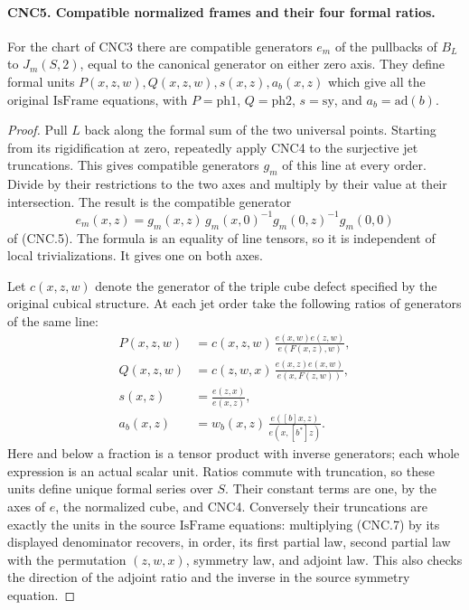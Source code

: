 \paragraph{CNC5. Compatible normalized frames and their four formal ratios.}
\label{claim:CNC5}
For the chart of CNC3 there are compatible generators \(e_m\) of
the pullbacks of \(B_L\) to \(J_m(S,2)\), equal to the canonical
generator on either zero axis.  They define formal units
\(P(x,z,w),Q(x,z,w),s(x,z),a_b(x,z)\) which give all the original
\(\mathrm{IsFrame}\) equations, with \(P=\mathrm{ph1}\),
\(Q=\mathrm{ph2}\), \(s=\mathrm{sy}\), and
\(a_b=\mathrm{ad}(b)\).
\begin{proof}
Pull \(L\) back along the formal sum of the two universal points.
Starting from its rigidification at zero, repeatedly apply CNC4 to the
surjective jet truncations.  This gives compatible generators \(g_m\)
of this line at every order.  Divide by their restrictions to the two
axes and multiply by their value at their intersection.  The result is
the compatible generator
\[
 e_m(x,z)=g_m(x,z)\,g_m(x,0)^{-1}g_m(0,z)^{-1}g_m(0,0)
                                                               \tag{CNC.6}
\]
of (CNC.5).  The formula is an equality of line tensors, so it is
independent of local trivializations.  It gives one on both axes.

Let \(c(x,z,w)\) denote the generator of the triple cube defect
specified by the original cubical structure.  At each jet order take
the following ratios of generators of the same line:
\[
\begin{aligned}
 P(x,z,w)&=c(x,z,w)\,
              \frac{e(x,w)e(z,w)}{e(F(x,z),w)},\\
 Q(x,z,w)&=c(z,w,x)\,
              \frac{e(x,z)e(x,w)}{e(x,F(z,w))},\\
 s(x,z)&=\frac{e(z,x)}{e(x,z)},\\
 a_b(x,z)&=w_b(x,z)\,
                    \frac{e([b]x,z)}{e(x,[b^*]z)}.
\end{aligned}                                                   \tag{CNC.7}
\]
Here and below a fraction is a tensor product with inverse generators;
each whole expression is an actual scalar unit.  Ratios commute with
truncation, so these units define unique formal series over \(S\).
Their constant terms are one, by the axes of \(e\), the normalized
cube, and CNC4.  Conversely their truncations are exactly the units in
the source \(\mathrm{IsFrame}\) equations: multiplying (CNC.7)
by its displayed denominator recovers, in order, its first partial
law, second partial law with the permutation \((z,w,x)\), symmetry
law, and adjoint law.  This also checks the direction of the adjoint
ratio and the inverse in the source symmetry equation.
\end{proof}

